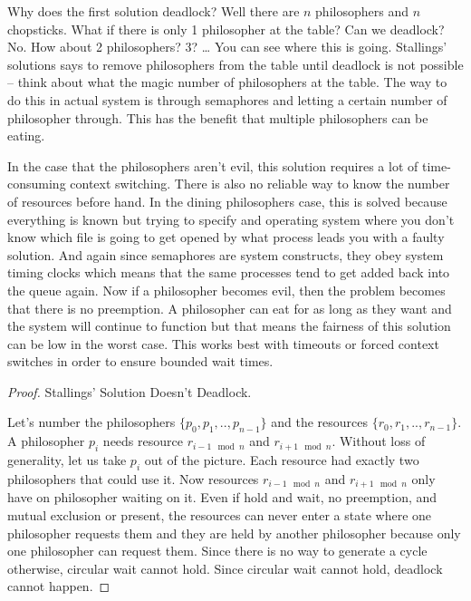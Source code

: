 Why does the first solution deadlock? Well there are $n$ philosophers and $n$ chopsticks.
What if there is only 1 philosopher at the table? Can we deadlock? No.
How about 2 philosophers? 3? \ldots{} You can see where this is going.
Stallings' \cite[P. 280]{stalling} solutions says to remove philosophers from the table until deadlock is not possible -- think about what the magic number of philosophers at the table.
The way to do this in actual system is through semaphores and letting a certain number of philosopher through.
This has the benefit that multiple philosophers can be eating.

In the case that the philosophers aren't evil, this solution requires a lot of time-consuming context switching.
There is also no reliable way to know the number of resources before hand.
In the dining philosophers case, this is solved because everything is known but trying to specify and operating system where you don't know which file is going to get opened by what process leads you with a faulty solution.
And again since semaphores are system constructs, they obey system timing clocks which means that the same processes tend to get added back into the queue again.
Now if a philosopher becomes evil, then the problem becomes that there is no preemption.
A philosopher can eat for as long as they want and the system will continue to function but that means the fairness of this solution can be low in the worst case.
This works best with timeouts or forced context switches in order to ensure bounded wait times.

\begin{proof} Stallings' Solution Doesn't Deadlock.

Let's number the philosophers $\{p_0, p_1, .., p_{n-1}\}$ and the resources $\{r_0, r_1, .., r_{n-1}\}$. A philosopher $p_i$ needs resource $r_{i-1 \mod n}$ and $r_{i + 1 \mod n}$. Without loss of generality, let us take $p_i$ out of the picture. Each resource had exactly two philosophers that could use it. Now resources $r_{i-1 \mod n}$ and $r_{i + 1 \mod n}$ only have on philosopher waiting on it. Even if hold and wait, no preemption, and mutual exclusion or present, the resources can never enter a state where one philosopher requests them and they are held by another philosopher because only one philosopher can request them. Since there is no way to generate a cycle otherwise, circular wait cannot hold. Since circular wait cannot hold, deadlock cannot happen.

\end{proof}


